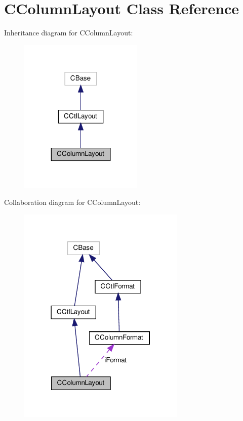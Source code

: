 \hypertarget{classCColumnLayout}{}\section{C\+Column\+Layout Class Reference}
\label{classCColumnLayout}


Inheritance diagram for C\+Column\+Layout\+:
\nopagebreak
\begin{figure}[H]
\begin{center}
\leavevmode
\includegraphics[width=167pt]{classCColumnLayout__inherit__graph}
\end{center}
\end{figure}


Collaboration diagram for C\+Column\+Layout\+:
\nopagebreak
\begin{figure}[H]
\begin{center}
\leavevmode
\includegraphics[width=226pt]{classCColumnLayout__coll__graph}
\end{center}
\end{figure}
